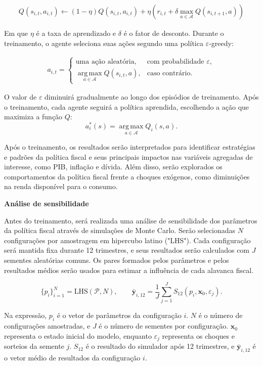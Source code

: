 \documentclass[12pt,a4paper]{article}
\begin{document}
\[
\begin{aligned}
Q(s_{i,t},a_{i,t})
\leftarrow
(1-\eta)Q(s_{i,t},a_{i,t})
+
\eta\left(
r_{i,t}
+
\delta \max_{a\in\mathcal{A}} Q(s_{i,t+1},a)
\right)
\end{aligned}
\]

Em que \(\eta\) é a taxa de aprendizado e \(\delta\) é o fator de desconto. Durante o treinamento, o agente seleciona suas ações segundo
uma política \(\varepsilon\)-greedy:

\[
\begin{aligned}
a_{i,t} =
\begin{cases}
\text{uma ação aleatória},
    & \text{com probabilidade } \varepsilon,\\[4pt]
\displaystyle\operatorname*{arg\,max}_{a\in\mathcal{A}}
    Q(s_{i,t},a),
    & \text{caso contrário}.
\end{cases}
\end{aligned}
\]

O valor de \(\varepsilon\) diminuirá gradualmente ao longo dos episódios de treinamento. Após o treinamento, cada agente seguirá
a política aprendida, escolhendo a ação que maximiza a função \(Q\):
\[
a_i^{*}(s)
=
\operatorname*{arg\,max}_{a\in\mathcal{A}} Q_i(s,a).
\]

Após o treinamento, os resultados serão interpretados para identificar estratégias e padrões da política fiscal e seus principais impactos nas variáveis agregadas de interesse, como PIB, inflação e dívida. Além disso, serão explorados os comportamentos da política fiscal frente a choques exógenos, como diminuições na renda disponível para o consumo.

\textbf{Análise de sensibilidade}

Antes do treinamento, será realizada uma análise de sensibilidade dos
parâmetros da política fiscal através de simulações de Monte Carlo. Serão selecionadas \(N\) configurações por amostragem em hipercubo latino ("LHS").
Cada configuração será mantida fixa durante 12 trimestres, e seus
resultados serão calculados com \(J\) sementes aleatórias comuns. Os pares
formados pelos parâmetros e pelos resultados médios serão usados
para estimar a influência de cada alavanca fiscal.

\[
\{p_i\}_{i=1}^{N}=\mathrm{LHS}(\mathcal{P},N),
\qquad
\bar{\mathbf{y}}_{i,12}
=\frac{1}{J}\sum_{j=1}^{J}
S_{12}(p_i,\mathbf{x}_0,\varepsilon_j).
\]

Na expressão, \(p_i\) é o vetor de parâmetros da configuração \(i\). \(N\) é o número de configurações amostradas, e \(J\) é o número de sementes por configuração. \(\mathbf{x}_0\) representa o estado inicial do modelo, enquanto \(\varepsilon_j\) representa os choques e sorteios da semente \(j\). \(S_{12}\) é o resultado do simulador após 12 trimestres, e \(\bar{\mathbf{y}}_{i,12}\) é o vetor médio de resultados da configuração \(i\).
\end{document}
